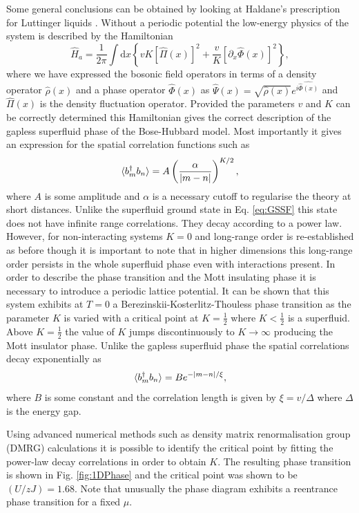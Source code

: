 Some general conclusions can be obtained by looking at Haldane's
prescription for Luttinger liquids \cite{haldane1981,
  giamarchi}. Without a periodic potential the low-energy physics of
the system is described by the Hamiltonian
\begin{equation}
  \hat{H}_a = \frac{1}{2 \pi} \int \mathrm{d} x \left\{ v K [ \hat{\Pi}(x)
    ]^2 + \frac{v} {K} [\partial_x \hat{\Phi}(x) ]^2 \right\},
\end{equation}
where we have expressed the bosonic field operators in terms of a
density operator $\hat{\rho}(x)$ and a phase operator $\hat{\Phi}(x)$
as $\hat{\Psi}(x) = \sqrt{\hat{\rho}(x)} e^{i \hat{\hat{\Phi}(x)}}$
and $\hat{\Pi}(x)$ is the density fluctuation operator. Provided the
parameters $v$ and $K$ can be correctly determined this Hamiltonian
gives the correct description of the gapless superfluid phase of the
Bose-Hubbard model. Most importantly it gives an expression for the
spatial correlation functions such as
\begin{equation}
  \langle b^\dagger_m b_n \rangle = A \left( \frac{\alpha} {|m - n|} \right)^{K/2},
\end{equation}
where $A$ is some amplitude and $\alpha$ is a necessary cutoff to
regularise the theory at short distances. Unlike the superfluid ground
state in Eq. \eqref{eq:GSSF} this state does not have infinite range
correlations. They decay according to a power law. However, for
non-interacting systems $K = 0$ and long-range order is re-established
as before though it is important to note that in higher dimensions
this long-range order persists in the whole superfluid phase even with
interactions present. In order to describe the phase transition and
the Mott insulating phase it is necessary to introduce a periodic
lattice potential. It can be shown that this system exhibits at
$T = 0$ a Berezinskii-Kosterlitz-Thouless phase transition as the
parameter $K$ is varied with a critical point at $K = \frac{1}{2}$
where $K < \frac{1}{2}$ is a superfluid. Above $K = \frac{1}{2}$ the
value of $K$ jumps discontinuously to $K \rightarrow \infty$ producing
the Mott insulator phase. Unlike the gapless superfluid phase the
spatial correlations decay exponentially as
\begin{equation}
  \langle b^\dagger_m b_n \rangle = B e^{ - |m - n|/\xi},
\end{equation}
where $B$ is some constant  and the correlation length is given by
$\xi = v / \Delta$ where $\Delta$ is the energy gap.

Using advanced numerical methods such as density matrix
renormalisation group (DMRG) calculations it is possible to identify
the critical point by fitting the power-law decay correlations in
order to obtain $K$. The resulting phase transition is shown in
Fig. \ref{fig:1DPhase} and the critical point was shown to be $(U/zJ) = 1.68$. Note
that unusually the phase diagram exhibits a reentrance phase
transition for a fixed $\mu$.

